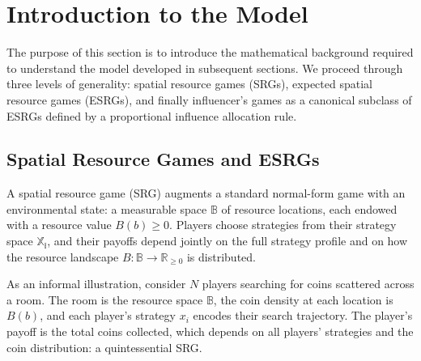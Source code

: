 \documentclass{article}
\begin{document}


    \section{Introduction to the Model}\label{sec:SI_model_intro}
        The purpose of this section is to introduce the mathematical background required to understand the model developed in subsequent sections. We proceed through three levels of generality: spatial resource games (SRGs), expected spatial resource games (ESRGs), and finally influencer's games as a canonical subclass of ESRGs defined by a proportional influence allocation rule. 
       
        \subsection{Spatial Resource Games and ESRGs}
            A spatial resource game (SRG) augments a standard normal-form game \cite{osborne1994course} with an environmental state: a measurable space $\mathbb{B}$ of resource locations, each endowed with a resource value $B(b) \geq 0$. Players choose strategies from their strategy space $\mathbb{X_i}$, and their payoffs depend jointly on the full strategy profile and on how the resource landscape $B:\mathbb{B}\to\mathbb{R}_{\geq 0}$ is distributed.

            As an informal illustration, consider $N$ players searching for coins scattered across a room. The room is the resource space $\mathbb{B}$, the coin density at each location is $B(b)$, and each player's strategy $x_i$ encodes their search trajectory. The player's payoff is the total coins collected, which depends on all players' strategies and the coin distribution: a quintessential SRG.
\end{document}
